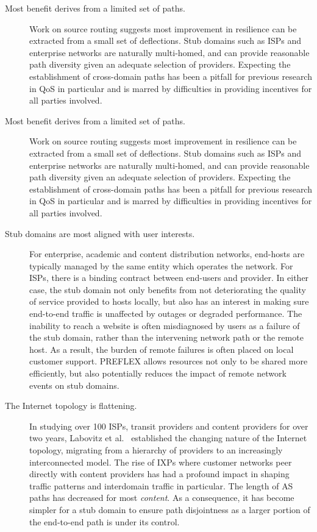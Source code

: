 \renewcommand{\descriptionlabel}[1]{\hspace{\labelsep}\textbf{#1}}
\begin{description}
\item[Most benefit derives from a limited set of paths.]{Work on source routing \cite{Gummadi:2004p131,Yang:2006p405} suggests most improvement in resilience can be extracted from a small set of deflections.
    Stub domains such as \acp{ISP} and enterprise networks are naturally multi-homed, and can provide reasonable path diversity given an adequate selection of providers.
    Expecting the establishment of cross-domain paths has been a pitfall for previous research in \ac{QoS} in particular and is marred by difficulties in providing incentives for all parties involved.
}

\item[Most benefit derives from a limited set of paths.]{
    Work on source routing \cite{Gummadi:2004p131,Yang:2006p405} suggests most improvement in resilience can be extracted from a small set of deflections.
    Stub domains such as \acp{ISP} and enterprise networks are naturally multi-homed, and can provide reasonable path diversity given an adequate selection of providers.
    Expecting the establishment of cross-domain paths has been a pitfall for previous research in \ac{QoS} in particular and is marred by difficulties in providing incentives for all parties involved.
}

\item[Stub domains are most aligned with user interests.]{
    For enterprise, academic and content distribution networks, end-hosts are typically managed by the same entity which operates the network.
    For \acp{ISP}, there is a binding contract between end-users and provider.
    In either case, the stub domain not only benefits from not deteriorating the quality of service provided to hosts locally, but also has an interest in making sure end-to-end traffic is unaffected by outages or degraded performance.
    The inability to reach a website is often misdiagnosed by users as a failure of the stub domain, rather than the intervening network path or the remote host.
    As a result, the burden of remote failures is often placed on local customer support.
    \ac{PREFLEX} allows resources not only to be shared more efficiently, but also potentially reduces the impact of remote network events on stub domains.
}

\item[The Internet topology is flattening.]{
    In studying over 100 \acp{ISP}, transit providers and content providers for over two years, Labovitz et al.\ \cite{Labovitz:2010p175} established the changing nature of the Internet topology, migrating from a hierarchy of providers to an increasingly interconnected model.
    The rise of \acp{IXP} where customer networks peer directly with content providers has had a profound impact in shaping traffic patterns and interdomain traffic in particular.
    The length of \ac{AS} paths has decreased for most \emph{content}.
    As a consequence, it has become simpler for a stub domain to ensure path disjointness as a larger portion of the end-to-end path is under its control.
}
\end{description}

